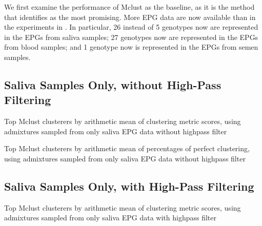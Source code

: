 We first examine the performance of Mclust as the baseline, as it is the method that \cite{odonnell_clustering_2021} identifies as the most promising. More EPG data are now available than in the experiments in \cite{odonnell_clustering_2021}. In particular, 26 instead of 5 genotypes now are represented in the EPGs from saliva samples; 27 genotypes now are represented in the EPGs from blood samples; and 1 genotype now is represented in the EPGs from semen samples.

\FloatBarrier
\subsection{Saliva Samples Only, without High-Pass Filtering}

\begin{table}[htbp]
\centering
{}
\caption{Top Mclust clusterers by arithmetic mean of clustering metric scores, using admixtures sampled from only saliva EPG data without highpass filter}
\label{table:top_mclust_clusterers_by_metrics_highpass_0-sampleids_saliva-nruns_1000}
\end{table}

\begin{table}[htbp]
\centering
{}
\caption{Top Mclust clusterers by arithmetic mean of percentages of perfect clustering, using admixtures sampled from only saliva EPG data without highpass filter}
\label{table:top_mclust_clusterers_by_binomial_confidence_highpass_0-sampleids_saliva-nruns_1000}
\end{table}

\FloatBarrier
\subsection{Saliva Samples Only, with High-Pass Filtering}

\begin{table}[htbp]
\centering
{}
\caption{Top Mclust clusterers by arithmetic mean of clustering metric scores, using admixtures sampled from only saliva EPG data with highpass filter}
\label{table:top_mclust_clusterers_by_metrics_highpass_71-sampleids_saliva-nruns_1000}
\end{table}

